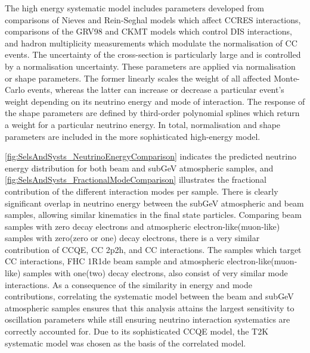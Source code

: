 The high energy systematic model includes parameters developed from comparisons of Nieves and Rein-Seghal models which affect CCRES interactions, comparisons of the GRV98 and CKMT models which control DIS interactions, and hadron multiplicity measurements which modulate the normalisation of CC events. The uncertainty of the \quickmath{\nu_{\tau}} cross-section is particularly large and is controlled by a  normalisation uncertainty. These parameters are applied via normalisation or shape parameters. The former linearly scales the weight of all affected Monte-Carlo events, whereas the latter can increase or decrease a particular event's weight depending on its neutrino energy and mode of interaction. The response of the shape parameters are defined by third-order polynomial splines which return a weight for a particular neutrino energy. In total,  normalisation and  shape parameters are included in the more sophisticated high-energy model.

\autoref{fig:SelsAndSysts_NeutrinoEnergyComparison} indicates the predicted neutrino energy distribution for both beam and subGeV atmospheric samples, and \autoref{fig:SelsAndSysts_FractionalModeComparison} illustrates the fractional contribution of the different interaction modes per sample. There is clearly significant overlap in neutrino energy between the subGeV atmospheric and beam samples, allowing similar kinematics in the final state particles. Comparing beam samples with zero decay electrons and atmospheric electron-like(muon-like) samples with zero(zero or one) decay electrons, there is a very similar contribution of CCQE, CC 2p2h, and CC\quickmath{1\pi^{\pm}} interactions. The samples which target CC\quickmath{1\pi^{\pm}} interactions, FHC 1R1de beam sample and atmospheric electron-like(muon-like) samples with one(two) decay electrons, also consist of very similar mode interactions. As a consequence of the similarity in energy and mode contributions, correlating the systematic model between the beam and subGeV atmospheric samples ensures that this analysis attains the largest sensitivity to oscillation parameters while still ensuring neutrino interaction systematics are correctly accounted for. Due to its sophisticated CCQE model, the T2K systematic model was chosen as the basis of the correlated model. 

